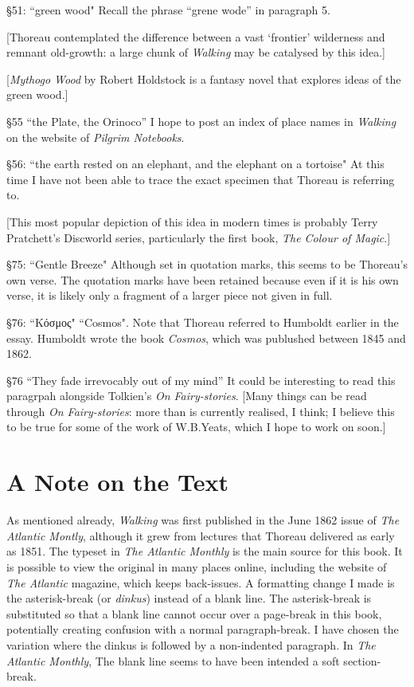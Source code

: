 \documentclass[twoside,openright,10pt]{memoir} %
\begin{document}
§51: “green wood"\newline
Recall the phrase ``grene wode'' in paragraph 5.

[Thoreau contemplated the difference between a vast `frontier' wilderness and remnant old-growth: a large chunk of \emph{Walking} may be catalysed by this idea.]

[\emph{Mythogo Wood} by Robert Holdstock is a fantasy novel that explores ideas of the green wood.]

§55 ``the Plate, the Orinoco''\newline
I hope to post an index of place names in \emph{Walking} on the website of \emph{Pilgrim Notebooks}.

§56: “the earth rested on an elephant, and the elephant on a tortoise"\newline
At this time I have not been able to trace the exact specimen that Thoreau is referring to.

[This most popular depiction of this idea in modern times is probably Terry Pratchett's Discworld series, particularly the first book, \emph{The Colour of Magic}.]

§75: “Gentle Breeze"\newline
Although set in quotation marks, this seems to be Thoreau's own verse. The quotation marks have been retained because even if it is his own verse, it is likely only a fragment of a larger piece not given in full.

§76: “\EBGaramond{}Κόσμος\normalfont" \newline
“Cosmos". Note that Thoreau referred to Humboldt earlier in the essay. Humboldt wrote the book \emph{Cosmos}, which was publushed between 1845 and 1862.

§76 ``They fade irrevocably out of my mind''
It could be interesting to read this paragrpah alongside Tolkien's \emph{On Fairy-stories}. [Many things can be read through \emph{On Fairy-stories}: more than is currently realised, I think; I believe this to be true for some of the work of W.\thinspace B.\thinspace Yeats, which I hope to work on soon.]

\section*{A Note on the Text}
As mentioned already, \emph{Walking} was first published in the June 1862 issue of \emph{The Atlantic Montly}, although it grew from lectures that Thoreau delivered as early as 1851. The typeset in \emph{The Atlantic Monthly} is the main source for this book. It is possible to view the original in many places online, including the website of \emph{The Atlantic} magazine, which keeps back-issues. A formatting change I made is the asterisk-break (or \emph{dinkus}) instead of a blank line. The asterisk-break is substituted so that a blank line cannot occur over a page-break in this book, potentially creating confusion with a normal paragraph-break. I have chosen the variation where the dinkus is followed by a non-indented paragraph. In \emph{The Atlantic Monthly}, The blank line seems to have been intended a soft section-break.
\end{document}
